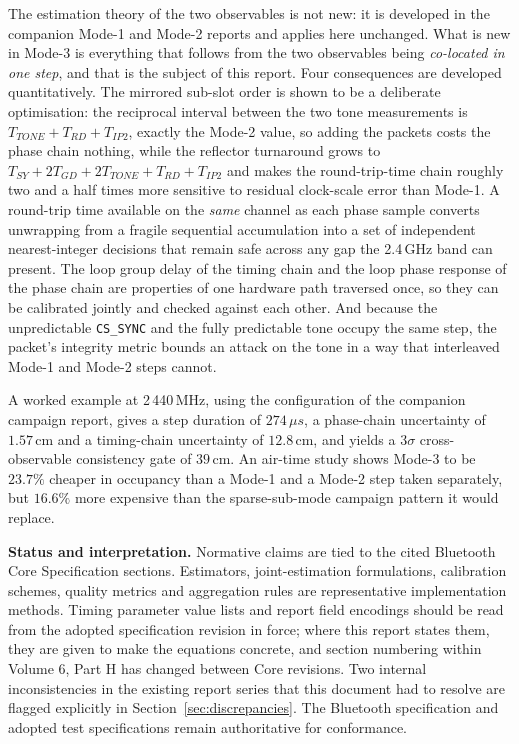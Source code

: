 \documentclass[11pt,a4paper]{article}
\newcommand{\us}{\,\ensuremath{\upmu}s}
\newcommand{\Tsy}{T_{SY}}
\newcommand{\Tgd}{T_{GD}}
\newcommand{\Ttone}{T_{TONE}}
\newcommand{\Trd}{T_{RD}}
\newcommand{\Tipthree}{T_{IP2}}
\newcommand{\code}[1]{\texttt{\small #1}}
\providecommand{\upmu}{\mu}
\begin{document}
The estimation theory of the two observables is not new: it is developed in the companion Mode-1 and
Mode-2 reports and applies here unchanged. What is new in Mode-3 is everything that follows from the
two observables being \emph{co-located in one step}, and that is the subject of this report. Four
consequences are developed quantitatively. The mirrored sub-slot order is shown to be a deliberate
optimisation: the reciprocal interval between the two tone measurements is
$\Ttone+\Trd+\Tipthree$, exactly the Mode-2 value, so adding the packets costs the phase chain
nothing, while the reflector turnaround grows to $\Tsy+2\Tgd+2\Ttone+\Trd+\Tipthree$ and makes the
round-trip-time chain roughly two and a half times more sensitive to residual clock-scale error than
Mode-1. A round-trip time available on the \emph{same} channel as each phase sample converts
unwrapping from a fragile sequential accumulation into a set of independent nearest-integer
decisions that remain safe across any gap the 2.4\,GHz band can present. The loop group delay of the
timing chain and the loop phase response of the phase chain are properties of one hardware path
traversed once, so they can be calibrated jointly and checked against each other. And because the
unpredictable \code{CS\_SYNC} and the fully predictable tone occupy the same step, the packet's
integrity metric bounds an attack on the tone in a way that interleaved Mode-1 and Mode-2 steps
cannot.

A worked example at 2\,440\,MHz, using the configuration of the companion campaign report, gives a
step duration of $274\us$, a phase-chain uncertainty of $1.57$\,cm and a timing-chain uncertainty of
$12.8$\,cm, and yields a $3\sigma$ cross-observable consistency gate of $39$\,cm. An air-time study
shows Mode-3 to be $23.7\%$ cheaper in occupancy than a Mode-1 and a Mode-2 step taken separately,
but $16.6\%$ more expensive than the sparse-sub-mode campaign pattern it would replace.

\begin{callout}
\textbf{Status and interpretation.} Normative claims are tied to the cited Bluetooth Core
Specification sections. Estimators, joint-estimation formulations, calibration schemes, quality
metrics and aggregation rules are representative implementation methods. Timing parameter value
lists and report field encodings should be read from the adopted specification revision in force;
where this report states them, they are given to make the equations concrete, and section numbering
within Volume 6, Part H has changed between Core revisions. Two internal inconsistencies in the
existing report series that this document had to resolve are flagged explicitly in
Section~\ref{sec:discrepancies}. The Bluetooth specification and adopted test specifications remain
authoritative for conformance.
\end{callout}
\end{document}
